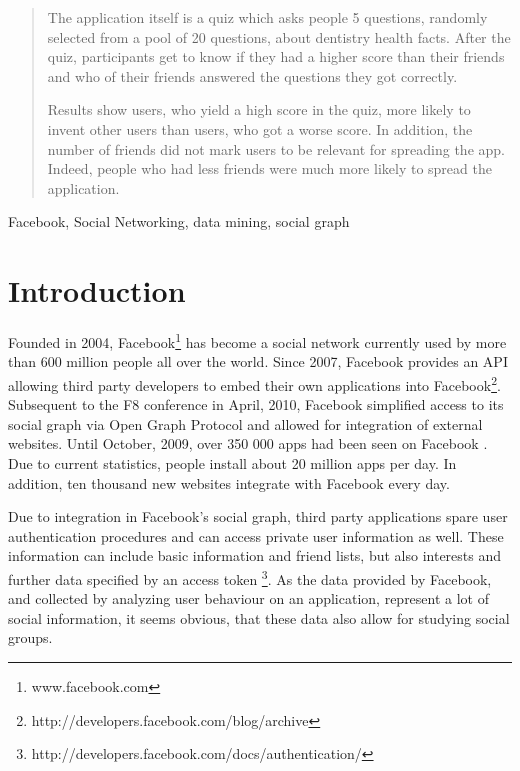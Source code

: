 \documentclass[preprint,12pt]{elsarticle}
\begin{document}
\begin{frontmatter}
\begin{abstract}
The application itself is a quiz which asks people 5
questions, randomly selected from a pool of 20 questions, 
about dentistry health facts. After the quiz, participants
get to know if they had a higher score than their friends and who of their
friends answered the questions they got correctly.

Results show users, who yield a high score in the quiz,
more likely to invent other users than users, who got a worse
score. In addition, the number of friends did not mark users to be
relevant for spreading the app. Indeed, people who had less friends
were much more likely to spread the application.
\end{abstract}

\begin{keyword}

Facebook, Social Networking, data mining, social graph
\end{keyword}

\end{frontmatter}



\section{Introduction}
\label{sec:introduction}
Founded in 2004, Facebook\footnote{www.facebook.com} has
become a social network currently used by more than 600 million people
all over the world\cite{facebook500}. Since 2007, Facebook provides an API allowing
third party developers to embed their own applications into
Facebook\footnote{http://developers.facebook.com/blog/archive}.
Subsequent to the F8 conference in April, 2010, Facebook simplified
access to its social graph via Open Graph Protocol \cite{facebookStats} and allowed
for integration of external websites. Until October, 2009,
over 350 000 apps had been seen on Facebook \cite{facebookBlog}.
Due to current statistics, people install about 20 million apps per day. In addition, ten thousand new
websites integrate with Facebook every day. \cite{facebookStats}

Due to integration in Facebook's social graph, third party
applications spare user authentication procedures and can access
private user information as well. These information can include basic
information and friend lists, but also interests and further data
specified by an access token  \footnote{http://developers.facebook.com/docs/authentication/}.
As the data provided by Facebook, and collected by analyzing user
behaviour on an application, represent a lot of social information, it
seems obvious, that these data also allow for studying social groups.
\end{document}
